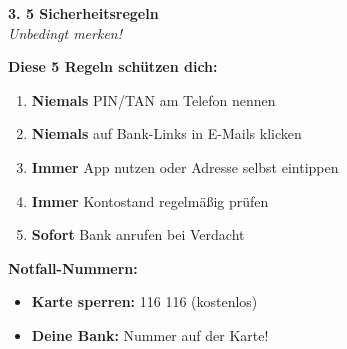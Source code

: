 \documentclass[a4paper,landscape,8pt]{extarticle}
\begin{document}
\hfill%
\begin{minipage}[t]{0.32\linewidth}
\begin{center}
\colorbox{securitygreen!15}{%
\begin{minipage}{0.95\linewidth}
\vspace{2mm}
\begin{center}
{\Large\bfseries\textcolor{securitygreen}{3. 5 Sicherheitsregeln}}\\[1pt]
{\footnotesize\itshape Unbedingt merken!}
\end{center}
\vspace{2mm}
\end{minipage}%
}
\end{center}

\vspace{1mm}

\textbf{Diese 5 Regeln schützen dich:}

\begin{enumerate}
\item \textbf{Niemals} PIN/TAN am Telefon nennen
\item \textbf{Niemals} auf Bank-Links in E-Mails klicken
\item \textbf{Immer} App nutzen oder Adresse selbst eintippen
\item \textbf{Immer} Kontostand regelmäßig prüfen
\item \textbf{Sofort} Bank anrufen bei Verdacht
\end{enumerate}

\vspace{2mm}

\textbf{Notfall-Nummern:}
\begin{itemize}
\item \textbf{Karte sperren:} 116 116 (kostenlos)
\item \textbf{Deine Bank:} Nummer auf der Karte!
\end{itemize}

\vspace{2mm}

\end{minipage}

\vspace{1mm}
\end{document}
